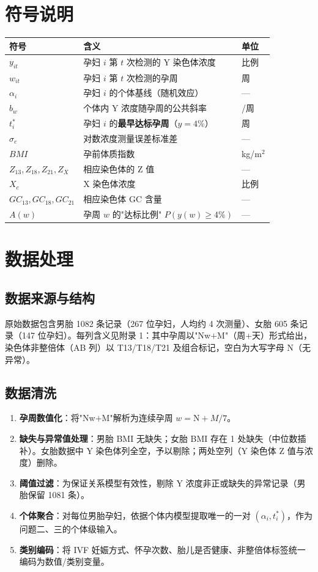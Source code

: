 \documentclass[12pt,a4paper]{article}
\begin{document}
\section{符号说明}
\begin{center}
\small
\begin{tabular}{lll}
\toprule
符号 & 含义 & 单位 \\
\midrule
$y_{it}$ & 孕妇 $i$ 第 $t$ 次检测的 Y 染色体浓度 & 比例 \\
$w_{it}$ & 孕妇 $i$ 第 $t$ 次检测的孕周 & 周 \\
$\alpha_i$ & 孕妇 $i$ 的个体基线（随机效应） & — \\
$b_w$ & 个体内 Y 浓度随孕周的公共斜率 & /周 \\
$t^*_i$ & 孕妇 $i$ 的\textbf{最早达标孕周}（$y=4\%$） & 周 \\
$\sigma_e$ & 对数浓度测量误差标准差 & — \\
$BMI$ & 孕前体质指数 & kg/m$^2$ \\
$Z_{13},Z_{18},Z_{21},Z_X$ & 相应染色体的 Z 值 & — \\
$X_c$ & X 染色体浓度 & 比例 \\
$GC_{13},GC_{18},GC_{21}$ & 相应染色体 GC 含量 & — \\
$A(w)$ & 孕周 $w$ 的"达标比例" $P(y(w)\geq4\%)$ & — \\
\bottomrule
\end{tabular}
\end{center}
\section{数据处理}
\subsection{数据来源与结构}
原始数据包含男胎 1082 条记录（267 位孕妇，人均约 4 次测量）、女胎 605 条记录（147 位孕妇）。每列含义见附录 1：其中孕周以"$\text{N}$w$+$M"（周+天）形式给出，染色体非整倍体（AB 列）以 T13/T18/T21 及组合标记，空白为大写字母 N（无异常）。

\subsection{数据清洗}
\begin{enumerate}
\item \textbf{孕周数值化}：将"$\text{N}$w$+$M"解析为连续孕周 $w=\text{N}+M/7$。
\item \textbf{缺失与异常值处理}：男胎 BMI 无缺失；女胎 BMI 存在 1 处缺失（中位数插补）。女胎数据中 Y 染色体列全空，予以剔除；两处空列（Y 染色体 Z 值与浓度）删除。
\item \textbf{阈值过滤}：为保证关系模型有效性，剔除 Y 浓度非正或缺失的异常记录（男胎保留 1081 条）。
\item \textbf{个体聚合}：对每位男胎孕妇，依据个体内模型提取唯一的一对 $(\alpha_i, t^*_i)$，作为问题二、三的个体级输入。
\item \textbf{类别编码}：将 IVF 妊娠方式、怀孕次数、胎儿是否健康、非整倍体标签统一编码为数值/类别变量。
\end{enumerate}
\end{document}
